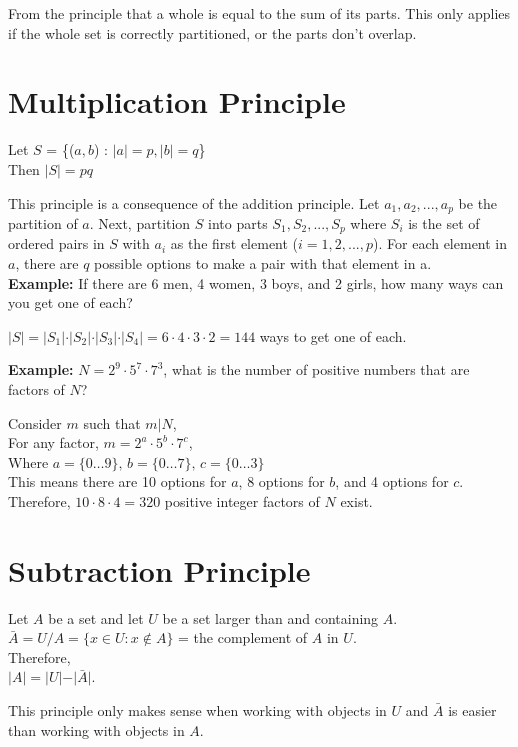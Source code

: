 \documentclass[12pt, letterpaper]{article}
\begin{document}
From the principle that a whole is equal to the sum of its parts. This only applies if the whole set is correctly partitioned, or the parts don't overlap. \\

\section*{Multiplication Principle}
\begin{center}
  Let \(S\) = \{(\(a, b\)) : \(\vert a \vert = p, \vert b \vert = q\)\} \\
  Then \(\vert S \vert = pq\)
\end{center}
This principle is a consequence of the addition principle. Let \(a_1, a_2,...,a_p\) be the partition of \(a\). Next, partition \(S\) into parts \(S_1, S_2,..., S_p\) where \(S_i\) is the set of ordered pairs in \(S\) with \(a_i\) as the first element (\(i = 1, 2,..., p\)). For each element in \(a\), there are \(q\) possible options to make a pair with that element in a. \\

\textbf{Example:} If there are 6 men, 4 women, 3 boys, and 2 girls, how many ways can you get one of each? \\
\begin{center}
  \(\vert S \vert = \vert S_1 \vert \cdot \vert S_2 \vert \cdot \vert S_3 \vert \cdot \vert S_4 \vert = 6 \cdot 4 \cdot 3 \cdot 2 = 144\) ways to get one of each.
\end{center}

\textbf{Example:} \(N = 2^9 \cdot 5^7 \cdot 7^3\), what is the number of positive numbers that are factors of \(N\)?

\begin{center}
  Consider \(m\) such that \(m \vert N\), \\
  For any factor, \(m = 2^a \cdot 5^b \cdot 7^c \), \\
  Where \(
    a = \{ 0 \dots 9 \}, \,b =\{0 \dots 7\}, \,c = \{0 \dots 3\}
  \) \\
  This means there are 10 options for \(a\), 8 options for \(b\), and 4 options for \(c\). \\
  Therefore, \(10 \cdot 8 \cdot 4 = 320\) positive integer factors of \(N\) exist.
\end{center}

\pagebreak
\section*{Subtraction Principle}
\begin{center}
  Let \(A\) be a set and let \(U\) be a set larger than and containing \(A\).
  \(\bar{A} = U / A = \{x \in U : x \notin A\}\) = the complement of \(A\) in \(U\). \\
  Therefore,\\
   \(\vert A \vert = \vert U \vert - \vert \bar{A} \vert\).
\end{center}
This principle only makes sense when working with objects in \(U\) and \(\bar{A}\) is easier than working with objects in \(A\). \\ 
\end{document}

